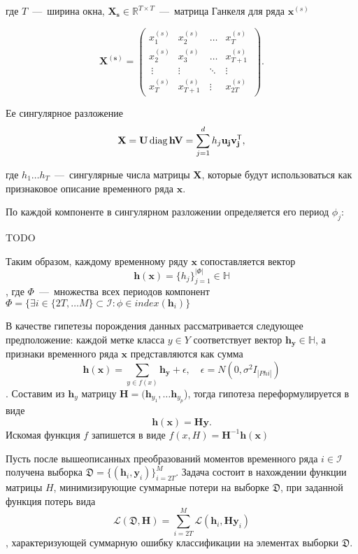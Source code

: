 \documentclass[12pt, twoside]{article}
\begin{document}
где $T$~---~ширина окна, $\mathbf{X_s}\in \mathds{R}^{T\times T}$~---~матрица Ганкеля для ряда $\mathbf{x}^{(s)}$

\begin{equation*}
\mathbf{X^{(s)}} = \left(
\begin{array}{cccc}
x_1^{(s)} & x_2^{(s)} & \ldots & x_T^{(s)}\\
x_2^{(s)} & x_3^{(s)}\ & \ldots & x_{T+1}^{(s)}\\\
\vdots & \vdots & \ddots & \vdots\\
x_T^{(s)} & x_{T+1}^{(s)} & \vdots & x_{2T}^{(s)}\
\end{array}
\right).
\end{equation*}

Ее сингулярное разложение 
\begin{equation}\label{eq3}
\mathbf{X} = \mathbf{U}\diag{\mathbf{h}}\mathbf{V} = \sum\limits_{j=1}^d h_j\mathbf{u_j}\mathbf{v_j^\mathsf{T}},
\end{equation}

где $h_1\ldots h_T$~---~сингулярные числа матрицы $\mathbf{X}$, которые будут использоваться как признаковое описание временного ряда $\mathbf{x}$.

По каждой компоненте в сингулярном разложении определяется его период $\phi_j$:

TODO

Таким образом, каждому временному ряду $\mathbf{x}$ сопоставляется вектор $$\mathbf{h(x)} = \{h_{j}\}_{j=1}^{|\Phi|}\in \mathds{H}$$, где $\Phi$~---~множества всех периодов компонент $\Phi = \{\exists i \in \{2T,\ldots M\}\subset\mathcal{I}: \phi \in index(\mathbf{h}_i)\} $

В качестве гипетезы порождения данных рассматривается следующее предположение: каждой метке класса $y\in Y$ соответствует вектор $\mathbf{h_y}\in \mathds{H}$, а признаки временного ряда $\mathbf{x}$ представляются как сумма 
$$\mathbf{h(x)} = \sum\limits_{y\in f(x)}\mathbf{h_y} + \epsilon,\quad \epsilon = N(0, \sigma^2I_{|Phi|})$$. Составим из $\mathbf{h}_y$ матрицу $\mathbf{H} = (\mathbf{h}_y_1,\ldots \mathbf{h}_y_p$), тогда гипотеза переформулируется в виде 
$$\mathbf{h(x)} = \mathbf{H}\mathbf{y}.$$ Искомая функция $f$ запишется в виде $f(x, H) = \mathbf{H}^{-1}\mathbf{h(x)}$

Пусть после вышеописанных преобразований моментов временного ряда $i\in \mathcal{I}$ получена выборка $\mathfrak{D}=\{(\mathbf{h}_i,\mathbf{y}_i)\}_{i=2T}^{M}$. Задача состоит в нахождении функции матрицы $H$, минимизирующие суммарные потери на выборке $\mathfrak{D}$, при заданной функция потерь вида $$\mathscr{L}(\mathfrak{D}, \mathbf{H}) = \sum\limits_{i=2T}^M \mathscr{L}(\mathbf{h}_i, \mathbf{H}\mathbf{y}_i)$$, характеризующей суммарную ошибку классификации на элементах выборки $\mathfrak{D}$. 
\end{document}
